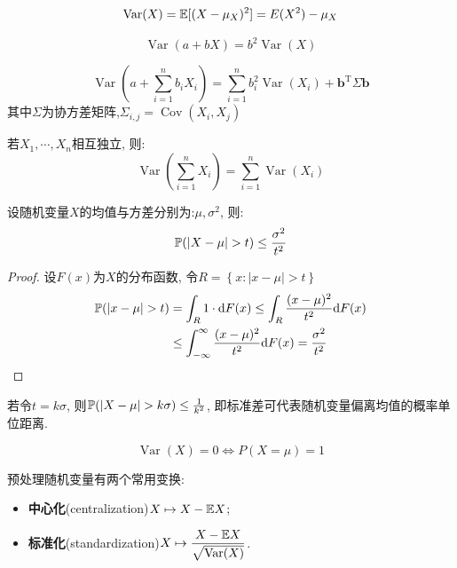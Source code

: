 \begin{proposition}
    \[ \operatorname{Var}(X)=\E[(X-\mu_X)^2]=E(X^2)-\mu_X \]
\end{proposition}

\begin{proposition}
    \[ \operatorname{Var}(a+bX)=b^2\operatorname{Var}(X) \]
\end{proposition}

\begin{proposition}
    \[ \operatorname{Var}(a+\sum_{i=1}^n b_i X_i)=\sum_{i=1}^n b_i^2 \operatorname{Var}(X_i)+\mathbf{b}^{\mathrm{T}} \Sigma \mathbf{b}\]
    其中$\Sigma$为协方差矩阵,$\Sigma_{i,j}=\operatorname{Cov}(X_i,X_j)$
\end{proposition}

\begin{corollary}
    若$X_1,\cdots ,X_n$相互独立, 则:
    \[ \operatorname{Var}(\sum_{i=1}^n X_i)=\sum_{i=1}^n\operatorname{Var}( X_i) \]
\end{corollary}

\begin{theorem}[Chebyshev不等式]
    设随机变量$X$的均值与方差分别为:$\mu, \sigma^2$, 则:
    \[ \P(\left| X-\mu \right| >t)\le \frac{\sigma^{2}}{t^{2}} \]
\end{theorem}

\begin{proof}
    设$F(x)$为$X$的分布函数, 令$R=\left\{ x:|x-\mu|>t \right\}$
    \begin{align*}
        \P(|x-\mu|>t) & = \int_R 1 \cdot  \d F(x) \le \int_R \frac{(x-\mu)^2}{t^{2}}\d F(x)                   \\
                      & \le \int_{-\infty}^{\infty}\frac{(x-\mu)^2}{t^{2}}\d F(x)  = \frac{\sigma^{2}}{t^{2}}
    \end{align*}
\end{proof}

\begin{remark}
    若令$t=k\sigma$, 则$\P(| X-\mu | >k\sigma)\le \frac1{k^{2}}$, 即标准差可代表随机变量偏离均值的概率单位距离.
\end{remark}

\begin{corollary}
    \[ \operatorname{Var}(X)=0 \Leftrightarrow P(X=\mu)=1 \]
\end{corollary}

预处理随机变量有两个常用变换:
\begin{itemize}
    \item \textbf{中心化}(centralization)$X \mapsto X-\E{X}$;
    \item \textbf{标准化}(standardization)$X \mapsto \dfrac{X-\E{X}}{\sqrt{\Var(X)}}$.
\end{itemize}


